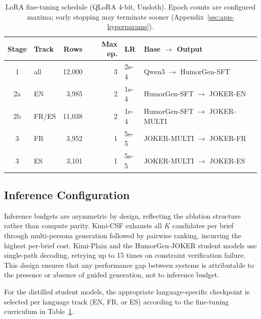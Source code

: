 \documentclass[]{ceurart}
\begin{document}
\begin{table}[t]
  \caption{LoRA fine-tuning schedule (QLoRA 4-bit, Unsloth).
    Epoch counts are configured maxima; early stopping may terminate sooner
    (Appendix~\ref{sec:app-hyperparams}).}
  \label{tab:curriculum}
  \small
  \begin{tabular}{clrrll}
    \toprule
    Stage & Track & Rows & Max ep. & LR & Base $\rightarrow$ Output \\
    \midrule
    1   & all   & 12{,}000 & 3    & 2e-4 & Qwen3 $\rightarrow$ HumorGen-SFT \\
    2a  & EN    & 3{,}985  & 2    & 1e-4 & HumorGen-SFT $\rightarrow$ JOKER-EN \\
    2b  & FR/ES & 11{,}038 & 2    & 1e-4 & HumorGen-SFT $\rightarrow$ JOKER-MULTI \\
    3   & FR    & 3{,}952  & 1    & 5e-5 & JOKER-MULTI $\rightarrow$ JOKER-FR \\
    3   & ES    & 3{,}101  & 1    & 5e-5 & JOKER-MULTI $\rightarrow$ JOKER-ES \\
    \bottomrule
  \end{tabular}
\end{table}

\subsection{Inference Configuration}
\label{sec:inference}

Inference budgets are asymmetric by design, reflecting the ablation structure
rather than compute parity.
Kimi-CSF exhausts all $K$ candidates per brief through multi-persona generation
followed by pairwise ranking, incurring the highest per-brief cost.
Kimi-Plain and the HumorGen-JOKER student models use single-path decoding,
retrying up to 15 times on constraint verification failure.
This design ensures that any performance gap between systems is attributable
to the presence or absence of guided generation, not to inference budget.

For the distilled student models, the appropriate language-specific checkpoint
is selected per language track (EN, FR, or ES) according to the fine-tuning
curriculum in Table~\ref{tab:curriculum}.
\end{document}
